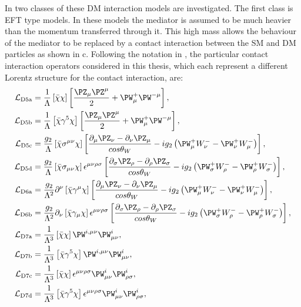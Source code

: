 In  two classes of these \ac{DM} interaction models are investigated. The first class is \ac{EFT} type models. In these models the mediator is assumed to be much heavier than the momentum transferred through it. This high mass allows the behaviour of the mediator to be replaced by a contact interaction between the \ac{SM} and \ac{DM} particles as shown in c. Following the notation in , the particular contact interaction operators considered in this thesis, which each represent a different Lorentz structure for the contact interaction, are:
\begin{align}
  \mathcal{L}_{\rm{D5a}} &=\frac{1}{\Lambda} \left[\bar{\chi}\chi\right] \left[\frac{\PZ_{\mu}\PZ^{\mu}}{2}+\PW_{\mu}^{+}\PW^{-\mu}\right],\\
  \mathcal{L}_{\rm{D5b}} &=\frac{1}{\Lambda} \left[\bar{\chi}\gamma^{5}\chi\right] \left[\frac{\PZ_{\mu}\PZ^{\mu}}{2}+\PW_{\mu}^{+}\PW^{-\mu}\right],\\
  \mathcal{L}_{\rm{D5c}} &=\frac{g_{2}}{\Lambda} \left[\bar{\chi}\sigma^{\mu\nu}\chi\right]\left[\frac{\partial_{\mu}\PZ_{\nu}-\partial_{\nu}\PZ_{\mu}}{cos\theta_{W}} - ig_{2} \left(\PW^{+}_{\mu}W^{-}_{\nu} - \PW^{+}_{\nu}W^{-}_{\mu}\right)\right],\\
  \mathcal{L}_{\rm{D5d}} &=\frac{g_{2}}{\Lambda} \left[\bar{\chi}\sigma_{\mu\nu}\chi\right] \epsilon^{\mu\nu\rho\sigma}\left[\frac{\partial_{\sigma}\PZ_{\rho}-\partial_{\rho}\PZ_{\sigma}}{cos\theta_{W}} - ig_{2} \left(\PW^{+}_{\sigma}W^{-}_{\rho} - \PW^{+}_{\rho}W^{-}_{\sigma}\right)\right],\\
  \mathcal{L}_{\rm{D6a}} &=\frac{g_{2}}{\Lambda^{2}}\partial^{\nu} \left[\bar{\chi}\gamma^{\mu}\chi\right] \left[\frac{\partial_{\mu}\PZ_{\nu}-\partial_{\nu}\PZ_{\mu}}{cos\theta_{W}} - ig_{2} \left(\PW^{+}_{\mu}W^{-}_{\nu} - \PW^{+}_{\nu}W^{-}_{\mu}\right)\right],\\
  \mathcal{L}_{\rm{D6b}} &=\frac{g_{2}}{\Lambda^{2}}\partial_{\nu} \left[\bar{\chi}\gamma_{\mu}\chi\right] \epsilon^{\mu\nu\rho\sigma}\left[\frac{\partial_{\sigma}\PZ_{\rho}-\partial_{\rho}\PZ_{\sigma}}{cos\theta_{W}} - ig_{2} \left(\PW^{+}_{\sigma}W^{-}_{\rho} - \PW^{+}_{\rho}W^{-}_{\sigma}\right)\right],\\
  \mathcal{L}_{\rm{D7a}} &=\frac{1}{\Lambda^{3}} \left[\bar{\chi}\chi\right] \PW^{i,\mu\nu}\PW_{\mu\nu}^{i},\\
  \mathcal{L}_{\rm{D7b}} &=\frac{1}{\Lambda^{3}} \left[\bar{\chi}\gamma^{5}\chi\right] \PW^{i,\mu\nu}\PW_{\mu\nu}^{i},\\
  \mathcal{L}_{\rm{D7c}} &=\frac{1}{\Lambda^{3}} \left[\bar{\chi}\chi\right] \epsilon^{\mu\nu\rho\sigma} \PW^{i}_{\mu\nu}\PW_{\rho\sigma}^{i},\\
  \mathcal{L}_{\rm{D7d}} &=\frac{1}{\Lambda^{3}} \left[\bar{\chi}\gamma^{5}\chi\right] \epsilon^{\mu\nu\rho\sigma} \PW^{i}_{\mu\nu}\PW_{\rho\sigma}^{i},\\
\end{align}
